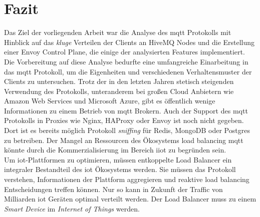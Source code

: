 \section{Fazit}
Das Ziel der vorliegenden Arbeit war die Analyse des \ac{mqtt} Protokolls mit Hinblick auf das \textit{kluge} Verteilen der Clients an HiveMQ Nodes und die Erstellung einer Envoy Control Plane, die einige der analysierten Features implementiert.
\\
Die Vorbereitung auf diese Analyse bedurfte eine umfangreiche Einarbeitung in das \ac{mqtt} Protokoll, um die Eigenheiten und verschiedenen Verhaltensmuster der Clients zu untersuchen.
Trotz der in den letzten Jahren stetisch steigenden Verwendung des Protokolls, unteranderem bei gro{\ss}en Cloud Anbietern wie Amazon Web Services und Microsoft Azure, gibt es öffentlich wenige Informationen zu einem Betrieb von \ac{mqtt} Brokern.
Auch der Support des \ac{mqtt} Protokolls in Proxies wie Nginx, HAProxy oder Envoy ist noch nicht gegeben. Dort ist es bereits möglich Protokoll \textit{sniffing} für Redis, MongoDB oder Postgres zu betreiben.
Der Mangel an Ressourcen des Ökosystems load balancing \ac{mqtt} könnte durch die Kommerzialisierung im Bereich \ac{iiot} zu begründen sein.
\\
Um \ac{iot}-Plattformen zu optimieren, müssen entkoppelte Load Balancer ein integraler Bestandteil des \ac{iot} Ökosystems werden. Sie müssen das Protokoll verstehen, Informationen der Plattform aggregieren und reaktive load balancing Entscheidungen treffen können. Nur so kann in Zukunft der Traffic von Milliarden \ac{iot} Geräten optimal verteilt werden.
Der Load Balancer muss zu einem \textit{Smart Device} im \textit{Internet of Things} werden.

